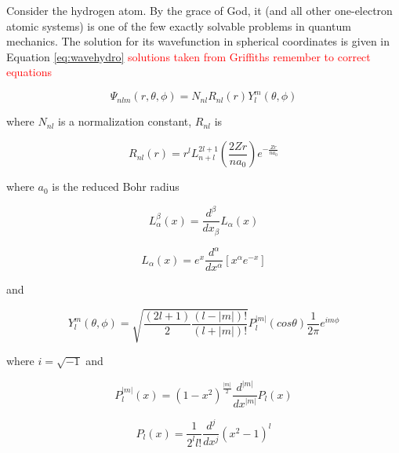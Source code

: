 \documentclass[12pt]{report}
\newcommand{\notetodylan}[1]{\textcolor{red}{#1}} %
\begin{document}
Consider the hydrogen atom. By the grace of God, it (and all other one-electron atomic systems) is one of the few exactly solvable problems in quantum mechanics. The solution for its wavefunction in spherical coordinates is given in Equation \ref{eq:wavehydro} \notetodylan{solutions taken from Griffiths remember to correct equations}

\begin{equation}
\label{eq:wavehydro}
\Psi_{nlm}(r, \theta, \phi) = N_{nl}R_{nl}(r)Y^{m}_{l}(\theta,\phi)
\end{equation} 

where $N_{nl}$ is a normalization constant, $R_{nl}$ is

\begin{equation}
\label{eq:wavehydro_R}
R_{nl}(r) = r^{l}L^{2l+1}_{n+l}\left(\frac{2Zr}{na_{0}}\right)e^{-\frac{Zr}{na_{0}}}
\end{equation} 

where $a_{0}$ is the reduced Bohr radius

\begin{equation}
\label{eq:wavehydro_L1}
L^{\beta}_{\alpha}(x) = \frac{d^\beta}{dx_{\beta}}L_{\alpha}(x)
\end{equation}

\begin{equation}
\label{eq:wavehydro_L2}
L_{\alpha}(x) = e^{x}\frac{d^{\alpha}}{dx^{\alpha}}\left[x^{\alpha}e^{-x}\right]
\end{equation}

and

\begin{equation}
\label{eq:wavehydro_Y1}
Y^{m}_{l}(\theta,\phi) = \sqrt{\frac{(2l + 1)}{2}\frac{(l-|m|)!}{(l+|m|)!}}P^{|m|}_{l}(cos\theta)\frac{1}{2\pi}e^{im\phi}
\end{equation}

where $i=\sqrt{-1}$ and 

\begin{equation}
\label{eq:wavehydro_Y2}
P^{|m|}_{l}(x) = (1 - x^{2})^{\frac{|m|}{2}}\frac{d^{|m|}}{dx^{|m|}}P_{l}(x)
\end{equation}

\begin{equation}
\label{eq:wavehydro_Y3}
P_{l}(x) = \frac{1}{2^{l}l!}\frac{d^{j}}{dx^{j}}(x^{2}-1)^{l}
\end{equation} 
\end{document}
